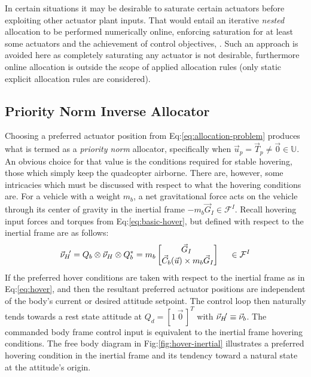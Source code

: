 \par
In certain situations it may be desirable to saturate certain actuators before exploiting other actuator plant inputs. That would entail an iterative \emph{nested} allocation to be performed numerically online, enforcing saturation for at least some actuators and the achievement of control objectives, \cite{allocation}. Such an approach is avoided here as completely saturating any actuator is not desirable, furthermore online allocation is outside the scope of applied allocation rules (only static explicit allocation rules are considered).
\subsection{Priority Norm Inverse Allocator}
\label{subsec:allocation.allocators.norminverse}
Choosing a preferred actuator position from Eq:\ref{eq:allocation-problem} produces what is termed as a \emph{priority norm} allocator, specifically when $\vec{u}_p=\vec{T}_p\not=\vec{0}\in\mathbb{U}$. An obvious choice for that value is the conditions required for stable hovering, those which simply keep the quadcopter airborne. There are, however, some intricacies which must be discussed with respect to what the hovering conditions are.
\newpage
For a vehicle with a weight $m_b$, a net gravitational force acts on the vehicle through its center of gravity in the inertial frame $-m_b\vec{G}_I\in\mathcal{F}^I$. Recall hovering input forces and torques from Eq:\ref{eq:basic-hover}, but defined with respect to the inertial frame are as follows:
\begin{equation}\label{eq:hover}
\vec{\nu}_H\text{}\hspace{-2pt}'=Q_b\otimes\vec{\nu}_H\otimes Q_b^*
=
m_b\begin{bmatrix}
\vec{G}_I\hspace{3pt}\\
\vec{C}_b(\vec{u}) \times m_b\vec{G}_I
\end{bmatrix}~~~~\in\mathcal{F}^I
\end{equation}
If the preferred hover conditions are taken with respect to the inertial frame as in Eq:\ref{eq:hover}, and then the resultant preferred actuator positions are independent of the body's current or desired attitude setpoint. The control loop then naturally tends towards a rest state attitude at $Q_d=[1~\vec{0}\hspace{2pt}]^T$ with $\vec{\nu}_H\text{}\hspace{-2pt}'\equiv\vec{\nu}_b$. The commanded body frame control input is equivalent to the inertial frame hovering conditions. The free body diagram in Fig:\ref{fig:hover-inertial} illustrates a preferred hovering condition in the inertial frame and its tendency toward a natural state at the attitude's origin.
